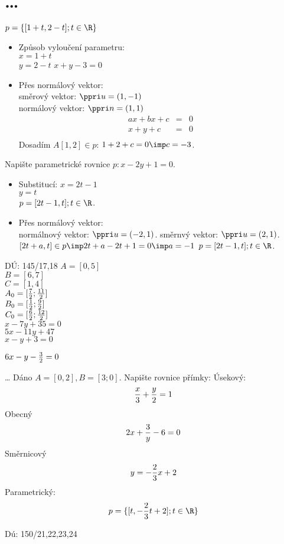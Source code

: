 
\BeginDoc{}
\section{\dots}

\Pr $p=\{[1+t,2-t];t\in\R\}$
\begin{itemize}
	\item Způsob vyloučení parametru:\\
		$x=1+t$\\
		$y=2-t$
		$x+y-3=0$
	\item Přes normálový vektor:\\
		směrový vektor: $\ppri u = (1,-1)$\\
		normálový vektor: $\ppri n = (1,1)$\\
		\begin{eqnarray*}
			ax+bx+c&=&0\\
			x+y+c &=& 0\\
		\end{eqnarray*}
		Dosadím $A[1,2]\in p$: $1+2+c=0 \imp c= -3$.
\end{itemize}
\Pr Napište parametrické rovnice $p: x-2y+1=0$.
\begin{itemize}
	\item Substitucí:
		$x = 2t -1$\\
		$y=t$\\
		$p = {[2t-1,t];t\in\R}$.
	\item Přes normálový vektor:\\
		normálnový vektor: $\ppri u = (-2,1)$.
		směrnvý vektor: $\ppri u = (2,1)$.
		$[2t+a,t]\in p \imp 2t+a-2t+1=0 \imp a=-1$ 
		$p = {[2t-1,t];t\in\R}$.
\end{itemize}
DÚ: 145/17,18
$A = [0,5]$\\
$B = [6,7]$\\
$C = [1,4]$\\
$A_0=[\frac 7 2 ; \frac{11}2]$\\
$B_0=[\frac 1 2 ; \frac{ 9}2]$\\
$C_0=[\frac 6 2 ; \frac{12}2]$\\
$x-7y+35=0$\\
$5x-11y+47$\\
$x-y+3=0$

$6x-y-\frac32=0$


{\Huge \dots}
\Pr Dáno $A=[0,2],B=[3;0]$. Napište rovnice přímky:
Úsekový: $$ \frac x 3 + \frac y 2 = 1 $$ 
Obecný $$ 2 x + \frac 3 y - 6 =0 $$
Směrnicový $$ y=-\frac 23 x +2  $$
Parametrický: $$ p = \{ [t,-\f 23 t +2];t\in\R \}$$

Dú: 150/21,22,23,24


\EndDoc
